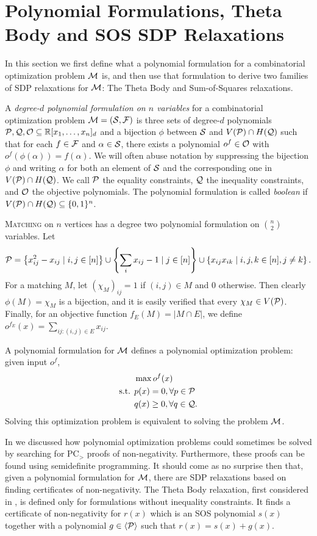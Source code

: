 \section{Polynomial Formulations, Theta Body and SOS SDP Relaxations}\label{sec:polyforms}
In this section we first define what a polynomial formulation for a combinatorial optimization problem $\mathcal M$ is, and then use that formulation to derive two families of SDP relaxations for $\mathcal M$: The Theta Body and Sum-of-Squares relaxations.
\begin{definition}
A \emph{degree-$d$ polynomial formulation on $n$ variables} for a combinatorial optimization problem $\mathcal M = (\mathcal S, \mathcal F)$ is three sets of degree-$d$ polynomials $\mathcal P,\mathcal Q,\mathcal O \subseteq \mathbb R[x_1,\dots,x_n]_d$ and a bijection $\phi$ between $\mathcal S$ and $V(\mathcal P) \cap H(\mathcal Q)$ such that for each $f \in \mathcal F$ and $\alpha \in \mathcal S$, there exists a polynomial $o^f \in \mathcal O$ with $o^f(\phi(\alpha)) = f(\alpha)$. We will often abuse notation by suppressing the bijection $\phi$ and writing $\alpha$ for both an element of $\mathcal S$ and the corresponding one in $V(\mathcal P) \cap H(\mathcal Q)$. We call $\mathcal P$ the equality constraints, $\mathcal Q$ the inequality constraints, and $\mathcal O$ the objective polynomials. The polynomial formulation is called \emph{boolean} if $V(\mathcal P) \cap H(\mathcal Q) \subseteq \{0,1\}^n$.
\end{definition}
\begin{example}
\textsc{Matching} on $n$ vertices has a degree two polynomial formulation on $\binom{n}{2}$ variables. Let
\[\mathcal P = \left\{x_{ij}^2 - x_{ij} \mid i,j \in [n]\right\} \cup \left\{\sum_i x_{ij} - 1 \mid j \in [n]\right\} \cup \left\{x_{ij}x_{ik} \mid i,j,k \in [n], j\neq k\right\}.\]
For a matching $M$, let $(\chi_M)_{ij} = 1$ if $(i,j) \in M$ and $0$ otherwise. Then clearly $\phi(M) = \chi_M$ is a bijection, and it is easily verified that every $\chi_M \in V(\mathcal P)$. Finally, for an objective function $f_E(M) = |M \cap E|$, we define $o^{f_E}(x) = \sum_{ij: (i,j) \in E} x_{ij}$.
\end{example}
A polynomial formulation for $\mathcal M$ defines a polynomial optimization problem: given input $o^f$,
\begin{align*}
&\max o^f(x) \\
\text{s.t. } &p(x) = 0, \forall p \in \mathcal P \\
&q(x) \geq 0, \forall q \in \mathcal Q.
\end{align*}
Solving this optimization problem is equivalent to solving the problem $\mathcal M$.

In  we discussed how polynomial optimization problems could sometimes be solved by searching for PC$_>$ proofs of non-negativity. Furthermore, these proofs can be found using semidefinite programming. It should come as no surprise then that, given a polynomial formulation for $\mathcal M$, there are SDP relaxations based on finding certificates of non-negativity. The Theta Body relaxation, first considered in \cite{GPT10}, is defined only for formulations without inequality constraints. It finds a certificate of non-negativity for $r(x)$ which is an SOS polynomial $s(x)$ together with a polynomial $g \in \langle \mathcal P \rangle$ such that $r(x) = s(x) + g(x)$.

